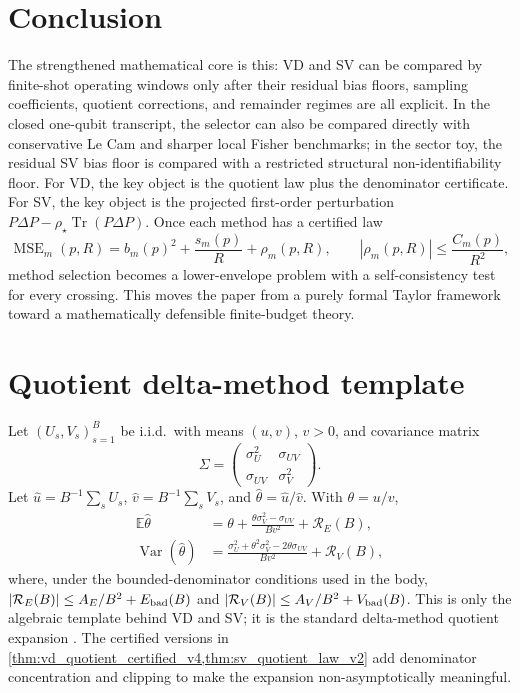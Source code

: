 \documentclass[11pt]{article}
\DeclareMathOperator{\Tr}{Tr}
\newcommand{\MSE}{\operatorname{MSE}}
\newcommand{\Var}{\operatorname{Var}}
\newcommand{\E}{\mathbb{E}}
\newcommand{\1}{\mathbf{1}}
\newcommand{\abs}[1]{\left\lvert #1 \right\rvert}
\begin{document}
\section{Conclusion}

The strengthened mathematical core is this: VD and SV can be compared by finite-shot operating windows only after their residual bias floors, sampling coefficients, quotient corrections, and remainder regimes are all explicit.  In the closed one-qubit transcript, the selector can also be compared directly with conservative Le Cam and sharper local Fisher benchmarks; in the sector toy, the residual SV bias floor is compared with a restricted structural non-identifiability floor.  For VD, the key object is the quotient law plus the denominator certificate.  For SV, the key object is the projected first-order perturbation \(P\Delta P-\rho_\star\Tr(P\Delta P)\).  Once each method has a certified law
\begin{equation}
    \MSE_m(p,R)=b_m(p)^2+\frac{s_m(p)}{R}+\rho_m(p,R),
    \qquad
    \abs{\rho_m(p,R)}\leq \frac{C_m(p)}{R^2},
\end{equation}
method selection becomes a lower-envelope problem with a self-consistency test for every crossing.  This moves the paper from a purely formal Taylor framework toward a mathematically defensible finite-budget theory.

\appendix

\section{Quotient delta-method template}

Let \((U_s,V_s)_{s=1}^B\) be i.i.d.\ with means \((u,v)\), \(v>0\), and covariance matrix
\begin{equation}
    \Sigma=\begin{pmatrix}\sigma_U^2&\sigma_{UV}\\\sigma_{UV}&\sigma_V^2\end{pmatrix}.
\end{equation}
Let \(\widehat u=B^{-1}\sum_sU_s\), \(\widehat v=B^{-1}\sum_sV_s\), and \(\widehat\theta=\widehat u/\widehat v\).  With \(\theta=u/v\),
\begin{align}
    \E\widehat\theta
    &=\theta+\frac{\theta\sigma_V^2-\sigma_{UV}}{Bv^2}+\mathcal R_E(B),\\
    \Var(\widehat\theta)
    &=\frac{\sigma_U^2+\theta^2\sigma_V^2-2\theta\sigma_{UV}}{Bv^2}+\mathcal R_V(B),
\end{align}
where, under the bounded-denominator conditions used in the body, \(\abs{\mathcal R_E(B)}\le A_E/B^2+E_{\rm bad}(B)\) and \(\abs{\mathcal R_V(B)}\le A_V/B^2+V_{\rm bad}(B)\).  This is only the algebraic template behind VD and SV; it is the standard delta-method quotient expansion \citep{VanDerVaart1998}.  The certified versions in \cref{thm:vd_quotient_certified_v4,thm:sv_quotient_law_v2} add denominator concentration and clipping to make the expansion non-asymptotically meaningful.
\end{document}

